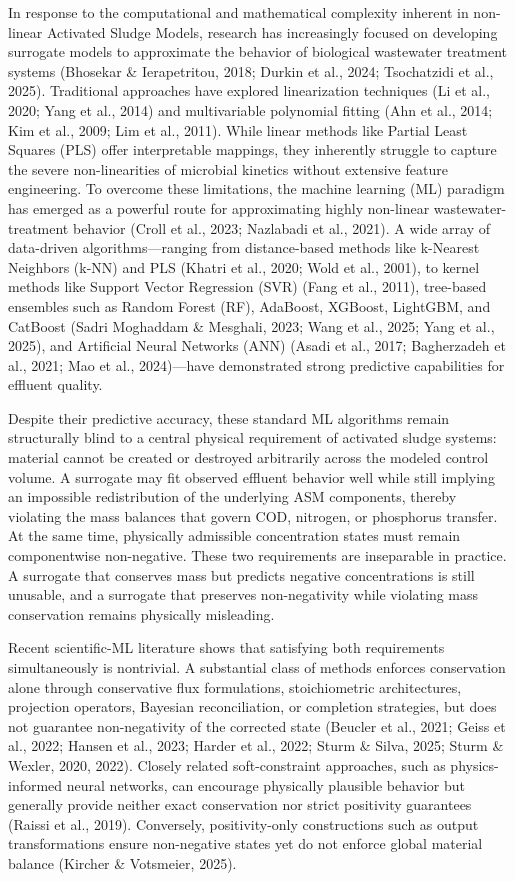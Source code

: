 \documentclass[11pt]{article}
\begin{document}
In response to the computational and mathematical complexity inherent in non-linear Activated Sludge Models, research has increasingly focused on developing surrogate models to approximate the behavior of biological wastewater treatment systems (Bhosekar \& Ierapetritou, 2018; Durkin et al., 2024; Tsochatzidi et al., 2025). Traditional approaches have explored linearization techniques (Li et al., 2020; Yang et al., 2014) and multivariable polynomial fitting (Ahn et al., 2014; Kim et al., 2009; Lim et al., 2011). While linear methods like Partial Least Squares (PLS) offer interpretable mappings, they inherently struggle to capture the severe non-linearities of microbial kinetics without extensive feature engineering. To overcome these limitations, the machine learning (ML) paradigm has emerged as a powerful route for approximating highly non-linear wastewater-treatment behavior (Croll et al., 2023; Nazlabadi et al., 2021). A wide array of data-driven algorithms—ranging from distance-based methods like k-Nearest Neighbors (k-NN) and PLS (Khatri et al., 2020; Wold et al., 2001), to kernel methods like Support Vector Regression (SVR) (Fang et al., 2011), tree-based ensembles such as Random Forest (RF), AdaBoost, XGBoost, LightGBM, and CatBoost (Sadri Moghaddam \& Mesghali, 2023; Wang et al., 2025; Yang et al., 2025), and Artificial Neural Networks (ANN) (Asadi et al., 2017; Bagherzadeh et al., 2021; Mao et al., 2024)—have demonstrated strong predictive capabilities for effluent quality. 

Despite their predictive accuracy, these standard ML algorithms remain structurally blind to a central physical requirement of activated sludge systems: material cannot be created or destroyed arbitrarily across the modeled control volume. A surrogate may fit observed effluent behavior well while still implying an impossible redistribution of the underlying ASM components, thereby violating the mass balances that govern COD, nitrogen, or phosphorus transfer. At the same time, physically admissible concentration states must remain componentwise non-negative. These two requirements are inseparable in practice. A surrogate that conserves mass but predicts negative concentrations is still unusable, and a surrogate that preserves non-negativity while violating mass conservation remains physically misleading.

Recent scientific-ML literature shows that satisfying both requirements simultaneously is nontrivial. A substantial class of methods enforces conservation alone through conservative flux formulations, stoichiometric architectures, projection operators, Bayesian reconciliation, or completion strategies, but does not guarantee non-negativity of the corrected state (Beucler et al., 2021; Geiss et al., 2022; Hansen et al., 2023; Harder et al., 2022; Sturm \& Silva, 2025; Sturm \& Wexler, 2020, 2022). Closely related soft-constraint approaches, such as physics-informed neural networks, can encourage physically plausible behavior but generally provide neither exact conservation nor strict positivity guarantees (Raissi et al., 2019). Conversely, positivity-only constructions such as output transformations ensure non-negative states yet do not enforce global material balance (Kircher \& Votsmeier, 2025).
\end{document}
